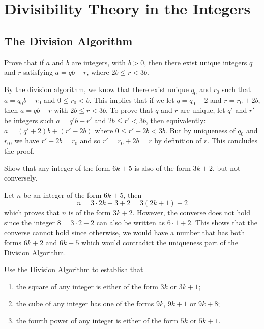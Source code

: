\chapter{Divisibility Theory in the Integers}

\section{The Division Algorithm}

\begin{exercise}
    Prove that if $a$ and $b$ are integers, with $b > 0$, then there exist unique integers $q$ and $r$ satisfying $a = qb + r$, where $2b \leq r < 3b$. \\
\end{exercise}

\begin{solution}
    By the division algorithm, we know that there exist unique $q_0$ and $r_0$ such that $a=q_0 b + r_0$ and $0 \leq r_0 < b$. This implies that if we let $q = q_0 - 2$ and $r = r_0 + 2b$, then $a = qb + r$ with $2b \leq r < 3b$. To prove that $q$ and $r$ are unique, let $q'$ and $r'$ be integers such $a = q'b + r'$ and $2b \leq r' < 3b$, then equivalently: $a = (q' + 2)b + (r' - 2b)$ where $0 \leq r' - 2b < 3b$. But by uniqueness of $q_0$ and $r_0$, we have $r' - 2b = r_0$ and so $r' = r_0 + 2b = r$ by definition of $r$. This concludes the proof. \\
\end{solution}

\begin{exercise}
    Show that any integer of the form $6k + 5$ is also of the form $3k + 2$, but not conversely. \\
\end{exercise}

\begin{solution}
    Let $n$ be an integer of the form $6k + 5$, then
    $$n = 3 \cdot 2k + 3 + 2 = 3(2k+1) + 2$$
    which proves that $n$ is of the form $3k+2$. However, the converse does not hold since the integer $8 = 3 \cdot 2 + 2$ can also be written as $6 \cdot 1 + 2$. This shows that the converse cannot hold since otherwise, we would have a number that has both forms $6k + 2$ and $6k + 5$ which would contradict the uniqueness part of the Division Algorithm. \\
\end{solution}

\begin{exercise}
    Use the Division Algorithm to establish that
    \begin{enumerate}
        \item the square of any integer is either of the form $3k$ or $3k + 1$;
        \item the cube of any integer has one of the forms $9k$, $9k + 1$ or $9k+8$;
        \item the fourth power of any integer is either of the form $5k$ or $5k+1$.
    \end{enumerate}
\end{exercise}

